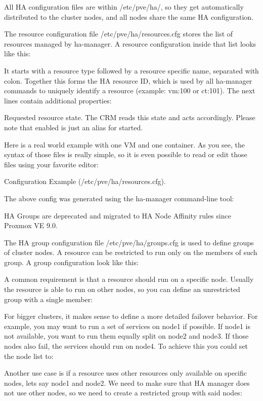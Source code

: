 All HA configuration files are within /etc/pve/ha/, so they get automatically distributed to the cluster nodes, and all nodes share the same HA configuration.

The resource configuration file /etc/pve/ha/resources.cfg stores the list of resources managed by ha-manager. A resource configuration inside that list looks like this:

It starts with a resource type followed by a resource specific name, separated with colon. Together this forms the HA resource ID, which is used by all ha-manager commands to uniquely identify a resource (example: vm:100 or ct:101). The next lines contain additional properties:

Requested resource state. The CRM reads this state and acts accordingly. Please note that enabled is just an alias for started.

Here is a real world example with one VM and one container. As you see, the syntax of those files is really simple, so it is even possible to read or edit those files using your favorite editor:

Configuration Example (/etc/pve/ha/resources.cfg).

The above config was generated using the ha-manager command-line tool:

HA Groups are deprecated and migrated to HA Node Affinity rules since Proxmox VE 9.0.

The HA group configuration file /etc/pve/ha/groups.cfg is used to define groups of cluster nodes. A resource can be restricted to run only on the members of such group. A group configuration look like this:

A common requirement is that a resource should run on a specific node. Usually the resource is able to run on other nodes, so you can define an unrestricted group with a single member:

For bigger clusters, it makes sense to define a more detailed failover behavior. For example, you may want to run a set of services on node1 if possible. If node1 is not available, you want to run them equally split on node2 and node3. If those nodes also fail, the services should run on node4. To achieve this you could set the node list to:

Another use case is if a resource uses other resources only available on specific nodes, lets say node1 and node2. We need to make sure that HA manager does not use other nodes, so we need to create a restricted group with said nodes:

